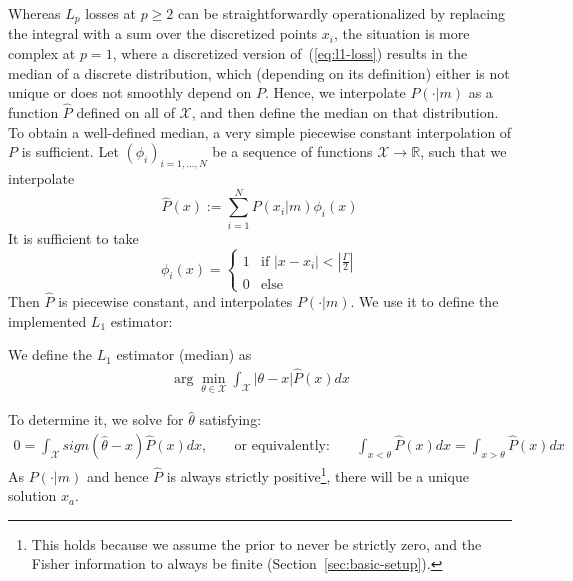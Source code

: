Whereas $L_p$ losses at $p\geq 2$ can be straightforwardly operationalized by replacing the integral with a sum over the discretized points $x_i$, the situation is more complex at $p=1$, where a discretized version of~(\ref{eq:l1-loss}) results in the median of a discrete distribution, which (depending on its definition) either is not unique or does not smoothly depend on $P$.
Hence, we interpolate $P(\cdot|m)$ as a function $\widehat{P}$ defined on all of $\mathcal{X}$, and then define the median on that distribution. %
To obtain a well-defined median, a very simple piecewise constant interpolation of $P$ is sufficient.
Let $(\phi_i)_{i=1, \dots, N}$ be a sequence of functions $\mathcal{X} \rightarrow \mathbb{R}$, such that we interpolate
\begin{equation}
    \widehat{P}(x) := \sum_{i=1}^N P(x_i|m) \phi_i(x)
\end{equation}
It is sufficient to take
\begin{equation}
    \phi_i(x) = \begin{cases}
        1 & \text{if } |x-x_i| < |\frac{\Gamma}{2}| \\
        0 & \text{else}
    \end{cases}
\end{equation}
Then $\widehat{P}$ is piecewise constant, and interpolates $P(\cdot|m)$.
We use it to define the implemented $L_1$ estimator:
\begin{defin}
We define the $L_1$ estimator (median) as
\begin{align}\label{eq:interval-l1-estimator}
     \arg\min_{\theta \in \mathcal{X}} \int_{\mathcal{X}} |\theta-x| \widehat{P}(x) dx 
\end{align}
\end{defin}
To determine it, we solve for $\widehat{\theta}$ satisfying:
\begin{align}
   0=  \int_{\mathcal{X}} sign(\widehat{\theta}-x) \widehat{P}(x) dx, 
\ \ \ \ \ \ \ \text{ or equivalently: } \ \ \ \ \ \ \ 
\int_{x<\theta} \widehat{P}(x) dx  = \int_{x>\theta} \widehat{P}(x) dx 
\end{align}
As $P(\cdot|m)$ and hence $\widehat{P}$ is always strictly positive\footnote{This holds because we assume the prior to never be strictly zero, and the Fisher information to always be finite (Section~\ref{sec:basic-setup}).}, there will be a unique solution $x_a$.
